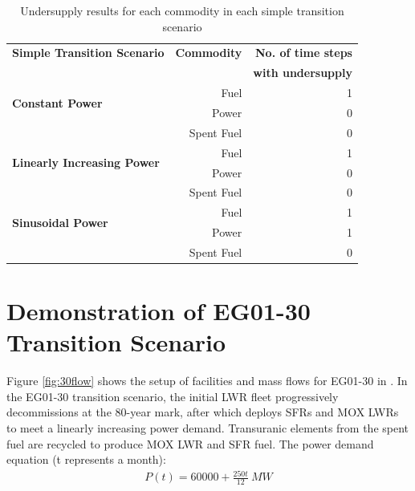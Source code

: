     \begin{table}[]
        \centering
        \doublespacing
        \caption {Undersupply results for each commodity in each simple transition scenario}
        \label{tab:transition-scenario-results}
            \small
            \begin{tabular}{l|rr}	
                \hline
                \textbf{Simple Transition Scenario}    & \textbf{Commodity}    & \textbf{No. of time steps} \\ 
                && \textbf{with undersupply} \\ \hline
                \multirow{2}{*}{\textbf{Constant Power}} & Fuel & 1 \\ 
                                                         & Power & 0 \\ 
                                                         & Spent Fuel & 0 \\ \hline
                \multirow{2}{*}{\textbf{Linearly Increasing Power}} & Fuel & 1 \\ 
                                                         & Power & 0 \\ 
                                                         & Spent Fuel & 0 \\ \hline
                \multirow{2}{*}{\textbf{Sinusoidal Power}} & Fuel & 1 \\ 
                                                         & Power & 1 \\ 
                                                         & Spent Fuel & 0 \\ \hline
                \end{tabular}
    \end{table}

\section{\deploy Demonstration of EG01-30 Transition Scenario} 
\label{sec:eg01-30}
Figure \ref{fig:30flow} shows the setup of facilities and mass flows 
for EG01-30 in \Cyclus. 
In the EG01-30 transition scenario, the initial LWR fleet 
progressively decommissions at the 80-year mark,
after which \deploy deploys \glspl{SFR} and \gls{MOX} \glspl{LWR} to 
meet a linearly increasing power demand. 
Transuranic elements from the spent fuel are recycled to 
produce \gls{MOX} \gls{LWR} and \gls{SFR} fuel. 
The power demand equation (t represents a month): 
\begin{align}
    P(t) = 60000 + \frac{250t}{12}\ MW
\end{align}

